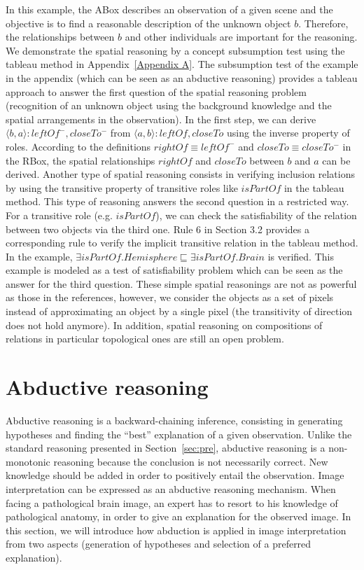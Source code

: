 \documentclass{article}
\begin{document}
In this example, the ABox describes an observation of a given scene and the objective is to find a reasonable description of  the unknown object $b$.
Therefore, the relationships between $b$ and other individuals are important for the reasoning. 
We demonstrate the spatial reasoning by a concept subsumption test using the tableau method in Appendix~\ref{Appendix A}.
The subsumption test of the example in the appendix (which can be seen as an abductive reasoning) provides a tableau approach to answer the first question of the spatial reasoning
problem (recognition of an unknown object using the background knowledge and the spatial arrangements in the observation).
In the first step, we can derive $\langle b,a\rangle:leftOf^-,closeTo^-$ from $\langle a,b\rangle:leftOf,closeTo$ using the inverse property of roles.
According to the definitions $rightOf\equiv leftOf^-$ and $closeTo\equiv closeTo^-$ in the RBox, the spatial relationships $rightOf$ and $closeTo$ between $b$ and $a$ can be derived.
Another type of spatial reasoning consists in verifying inclusion relations by using the transitive property of transitive roles like $isPartOf$ in the tableau method. 
This type of reasoning answers the second question in a restricted way. For a transitive role (e.g. $isPartOf$), we can check the satisfiability of the relation
between two objects via the third one. Rule 6 in Section 3.2 provides a corresponding rule to verify the implicit transitive relation in the tableau method. 
In the example, $\exists isPartOf. Hemisphere \sqsubseteq \exists isPartOf.Brain$ is verified.
This example is modeled as a test of satisfiability problem which can be seen as the answer for the third question.
These simple spatial reasonings are not as powerful as those in the references, however, we consider the objects as a set of pixels instead of approximating an object by a single pixel 
(the transitivity of direction does not hold anymore).
In addition, spatial reasoning on compositions of relations in particular topological ones are still an open problem.

\section{Abductive reasoning}\label{sec:abd}
Abductive reasoning is a backward-chaining inference, consisting in generating hypotheses and finding the ``best'' explanation of a given observation.
Unlike the standard reasoning presented in Section~\ref{sec:pre}, abductive reasoning is a non-monotonic reasoning because the conclusion is not necessarily correct.
New knowledge should be added in order to positively entail the observation.
Image interpretation can be expressed as an abductive reasoning  mechanism.
When facing a pathological brain image, an expert has to resort to his knowledge of pathological anatomy, in order to give  an explanation for the observed image. 
In this section, we will introduce how abduction is applied in image interpretation from two aspects (generation of hypotheses and selection of a preferred explanation).
\end{document}
